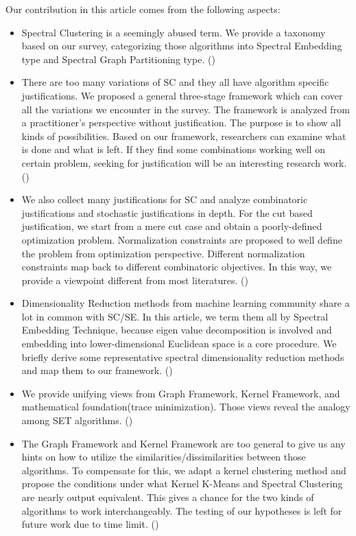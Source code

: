 Our contribution in this article comes from 
the following aspects:
\begin{itemize}
	\item Spectral Clustering is a seemingly abused term. 
	We provide a taxonomy based on our survey, categorizing 
	those algorithms into Spectral Embedding type and 
	Spectral Graph Partitioning type. (\rsec{\ref{sec:taxonomy}})
	\item There are too many variations of SC and they all have 
	algorithm specific justifications. We proposed a general 
	three-stage framework which can cover all the variations 
	we encounter in the survey. The framework is analyzed 
	from a practitioner's perspective without justification. 
	The purpose is to show all kinds of possibilities. 
	Based on our framework, researchers can examine what is
	done and what is left. If they find some combinations 
	working well on certain problem, seeking for justification 
	will be an interesting research work. (\rsec{\ref{sec:framework}})
	\item We also collect many justifications for SC 
	and analyze combinatoric justifications and stochastic 
	justifications in depth. For the cut based justification, 
	we start from a mere cut case and obtain a poorly-defined 
	optimization problem. Normalization constraints are proposed
	to well define the problem from optimization perspective. 
	Different normalization constraints map back to different 
	combinatoric objectives. In this way, we provide a 
	viewpoint different from most literatures.  
	(\rsec{\ref{sec:justification}})
	\item Dimensionality Reduction methods from machine learning 
	community share a lot in common with SC/SE. In this article, 
	we term them all by Spectral Embedding Technique, because
	eigen value decomposition is involved and embedding into 
	lower-dimensional Euclidean space is a core procedure. 
	We briefly derive some representative spectral dimensionality reduction 
	methods and map them to our framework. 
	(\rsec{\ref{sec:nldr}})
	\item We provide unifying views from Graph Framework, Kernel 
	Framework, and mathematical foundation(trace minimization). 
	Those views reveal the analogy among SET algorithms. 
	(\rsec{\ref{sec:unify}})
	\item The Graph Framework and Kernel Framework are too 
	general to give us any hints on how to utilize the 
	similarities/dissimilarities between those algorithms. 
	To compensate for this, 
	we adapt a kernel clustering method and propose
	the conditions under what Kernel K-Means and Spectral 
	Clustering are nearly output equivalent. 
	This gives a chance for the two kinds of algorithms 
	to work interchangeably. The testing 
	of our hypotheses is left for future work due to time limit. 
	(\rsec{\ref{sec:kcluster}})
\end{itemize}

